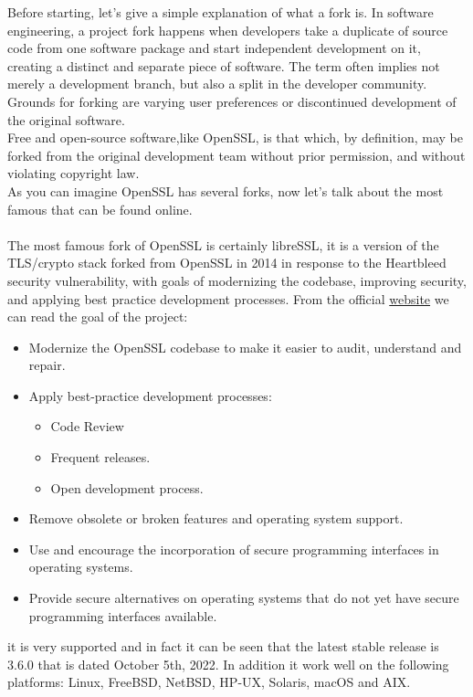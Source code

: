 \documentclass{article}
\begin{document}
Before starting, let's give a simple explanation of what a fork is. In software engineering, a project fork happens when developers take a duplicate of source code from one software package and start independent development on it, creating a distinct and separate piece of software. The term often implies not merely a development branch, but also a split in the developer community. Grounds for forking are varying user preferences or discontinued development of the original software.\\Free and open-source software,like OpenSSL, is that which, by definition, may be forked from the original development team without prior permission, and without violating copyright law.\\As you can imagine OpenSSL has several forks, now let's talk about the most famous that can be found online.\\\\
The most famous fork of OpenSSL is certainly libreSSL, it is a version of the TLS/crypto stack forked from OpenSSL in 2014 in response to the Heartbleed security vulnerability, with goals of modernizing the codebase, improving security, and applying best practice development processes. From the official \href{https://www.libressl.org/}{website} we can read the goal of the project:\\
\begin{itemize}
\item Modernize the OpenSSL codebase to make it easier to audit, understand and repair.
\item Apply best-practice development processes:
\begin{itemize}
\item Code Review
\item Frequent releases.
\item Open development process.
\end{itemize}
\item Remove obsolete or broken features and operating system support.
\item Use and encourage the incorporation of secure programming interfaces in operating systems.
\item Provide secure alternatives on operating systems that do not yet have secure programming interfaces available.
\end{itemize}
it is very supported and in fact it can be seen that the latest stable release is 3.6.0 that is dated October 5th, 2022. In addition it work well on the following platforms: Linux, FreeBSD, NetBSD, HP-UX, Solaris, macOS and AIX.\\\\
\end{document}
